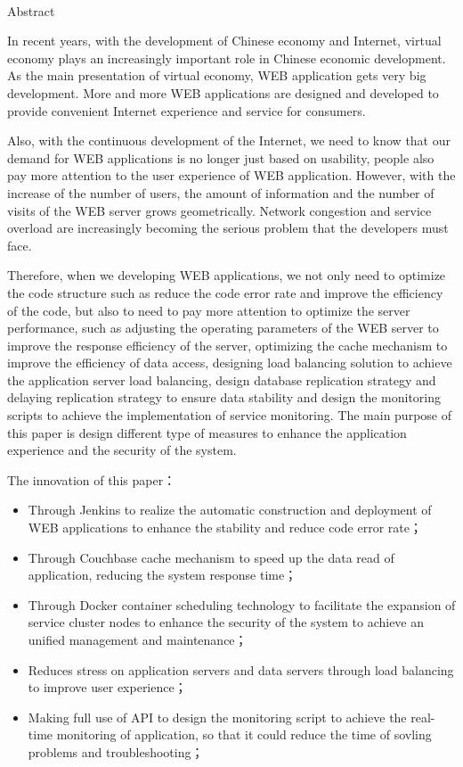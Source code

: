 \begin{center}
  {\sanhao[1.5]\heiti\oucetitle\\\vskip7pt Abstract}
\end{center}
{\normalsize\songti

   In recent years, with the development of Chinese economy and Internet, virtual economy plays an increasingly important role in Chinese economic development. As the main presentation of virtual economy, WEB application gets very big development. More and more WEB applications are designed and developed to provide convenient Internet experience and service for consumers.

   Also, with the continuous development of the Internet, we need to know that our demand for WEB applications is no longer just based on usability, people also pay more attention to the user experience of WEB application. However, with the increase of the number of users, the amount of information and the number of visits of the WEB server grows geometrically. Network congestion and service overload are increasingly becoming the serious problem that the developers must face.

   Therefore, when we developing WEB applications, we not only need to optimize the code structure such as reduce the code error rate and improve the efficiency of the code, but also to need to pay more attention to optimize the server performance, such as adjusting the operating parameters of the WEB server to improve the response efficiency of the server, optimizing the cache mechanism to improve the efficiency of data access, designing load balancing solution to achieve the application server load balancing, design database replication strategy and delaying replication strategy to ensure data stability and design the monitoring scripts to achieve the implementation of service monitoring. The main purpose of this paper is design different type of measures to enhance the application experience and the security of the system.

   The innovation of this paper：
  \begin{itemize}
    \item Through Jenkins to realize the automatic construction and deployment of WEB applications to enhance the stability and reduce code error rate；
    \item Through Couchbase cache mechanism to speed up the data read of application, reducing the system response time；
    \item Through Docker container scheduling technology to facilitate the expansion of service cluster nodes to enhance the security of the system to achieve an unified management and maintenance；
    \item Reduces stress on application servers and data servers through load balancing to improve user experience；
    \item Making full use of API to design the monitoring script to achieve the real-time monitoring of application, so that it could reduce the time of sovling problems and troubleshooting；
  \end{itemize}
}
